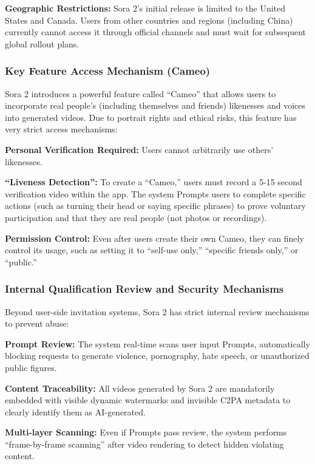 \textbf{Geographic Restrictions:}
Sora 2's initial release is limited to the United States and Canada. Users from other countries and regions (including China) currently cannot access it through official channels and must wait for subsequent global rollout plans.

\subsubsection{Key Feature Access Mechanism (Cameo)}

Sora 2 introduces a powerful feature called ``Cameo'' that allows users to incorporate real people's (including themselves and friends) likenesses and voices into generated videos. Due to portrait rights and ethical risks, this feature has very strict access mechanisms:

\textbf{Personal Verification Required:}
Users cannot arbitrarily use others' likenesses.

\textbf{``Liveness Detection'':}
To create a ``Cameo,'' users must record a 5-15 second verification video within the app. The system Prompts users to complete specific actions (such as turning their head or saying specific phrases) to prove voluntary participation and that they are real people (not photos or recordings).

\textbf{Permission Control:}
Even after users create their own Cameo, they can finely control its usage, such as setting it to ``self-use only,'' ``specific friends only,'' or ``public.''

\subsubsection{Internal Qualification Review and Security Mechanisms}

Beyond user-side invitation systems, Sora 2 has strict internal review mechanisms to prevent abuse:

\textbf{Prompt Review:}
The system real-time scans user input Prompts, automatically blocking requests to generate violence, pornography, hate speech, or unauthorized public figures.

\textbf{Content Traceability:}
All videos generated by Sora 2 are mandatorily embedded with visible dynamic watermarks and invisible C2PA metadata to clearly identify them as AI-generated.

\textbf{Multi-layer Scanning:}
Even if Prompts pass review, the system performs ``frame-by-frame scanning'' after video rendering to detect hidden violating content.




